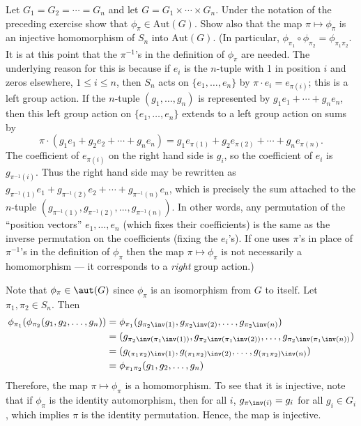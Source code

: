 \begin{exercise}\label{ex5.1.8}
    Let $G_1 = G_2 = \cdots = G_n$ and let $G = G_1 \times \cdots \times G_n$. Under the notation of the preceding exercise show that $\phi_\pi \in \text{Aut}(G)$. Show also that the map $\pi \mapsto \phi_\pi$ is an injective homomorphism of $S_n$ into $\text{Aut}(G)$. (In particular, $\phi_{\pi_1} \circ \phi_{\pi_2} = \phi_{\pi_1 \pi_2}$. It is at this point that the $\pi^{-1}$'s in the definition of $\phi_\pi$ are needed. The underlying reason for this is because if $e_i$ is the $n$-tuple with 1 in position $i$ and zeros elsewhere, $1 \leq i \leq n$, then $S_n$ acts on $\{e_1, \ldots, e_n\}$ by $\pi \cdot e_i = e_{\pi(i)}$; this is a left group action. If the $n$-tuple $(g_1, \ldots, g_n)$ is represented by $g_1 e_1 + \cdots + g_n e_n$, then this left group action on $\{e_1, \ldots, e_n\}$ extends to a left group action on sums by
    \[\pi \cdot (g_1 e_1 + g_2 e_2 + \cdots + g_n e_n) = g_1 e_{\pi(1)} + g_2 e_{\pi(2)} + \cdots + g_n e_{\pi(n)}.\]
    The coefficient of $e_{\pi(i)}$ on the right hand side is $g_i$, so the coefficient of $e_i$ is $g_{\pi^{-1}(i)}$. Thus the right hand side may be rewritten as $g_{\pi^{-1}(1)} e_1 + g_{\pi^{-1}(2)} e_2 + \cdots + g_{\pi^{-1}(n)} e_n$, which is precisely the sum attached to the $n$-tuple $(g_{\pi^{-1}(1)}, g_{\pi^{-1}(2)}, \ldots, g_{\pi^{-1}(n)})$. In other words, any permutation of the ``position vectors'' $e_1, \ldots, e_n$ (which fixes their coefficients) is the same as the inverse permutation on the coefficients (fixing the $e_i$'s). If one uses $\pi$'s in place of $\pi^{-1}$'s in the definition of $\phi_\pi$ then the map $\pi \mapsto \phi_\pi$ is not necessarily a homomorphism --- it corresponds to a \emph{right} group action.)
\end{exercise}

\begin{sol}
    Note that $\phi_\pi \in \aut(G)$ since $\phi_\pi$ is an isomorphism from $G$ to itself. Let $\pi_1, \pi_2 \in S_n$. Then
    \begin{align*}
        \phi_{\pi_1}(\phi_{\pi_2}(g_1, g_2, \ldots, g_n)) & = \phi_{\pi_1}(g_{\pi_2\inv(1)}, g_{\pi_2\inv(2)}, \ldots, g_{\pi_2\inv(n)}) \\
        & = (g_{\pi_2\inv(\pi_1\inv(1))}, g_{\pi_2\inv(\pi_1\inv(2))}, \ldots, g_{\pi_2\inv(\pi_1\inv(n))}) \\
        & = (g_{(\pi_1 \pi_2)\inv(1)}, g_{(\pi_1 \pi_2)\inv(2)}, \ldots, g_{(\pi_1 \pi_2)\inv(n)}) \\
        & = \phi_{\pi_1 \pi_2}(g_1, g_2, \ldots, g_n)
    \end{align*}
    Therefore, the map $\pi \mapsto \phi_\pi$ is a homomorphism. To see that it is injective, note that if $\phi_\pi$ is the identity automorphism, then for all $i$, $g_{\pi\inv(i)} = g_i$ for all $g_i \in G_i$, which implies $\pi$ is the identity permutation. Hence, the map is injective.
\end{sol}

